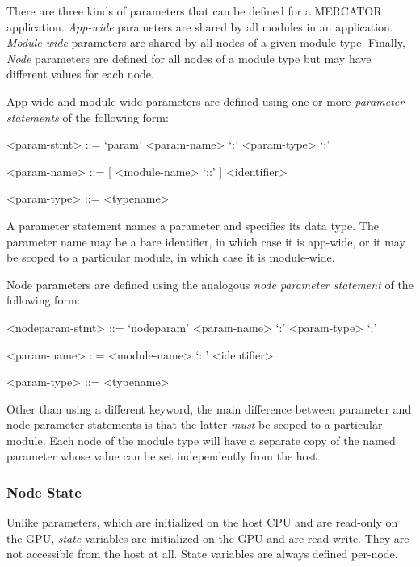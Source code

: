 \documentclass[11pt]{article}
\begin{document}
There are three kinds of parameters that can be defined for a
MERCATOR application.  \emph{App-wide} parameters are shared by
all modules in an application.  \emph{Module-wide} parameters are
shared by all nodes of a given module type.  Finally, \emph{Node}
parameters are defined for all nodes of a module type but may have
different values for each node.

App-wide and module-wide parameters are defined using one or more
\textit{parameter statements} of the following form:
\begin{grammar}

<param-stmt> ::= `param' <param-name> `:' <param-type> `;'

<param-name> ::= [ <module-name> `::' ] <identifier>

<param-type> ::= <typename>

\end{grammar}

A parameter statement names a parameter and specifies its data type.
The parameter name may be a bare identifier, in which case it is
app-wide, or it may be scoped to a particular module, in which case
it is module-wide.

Node parameters are defined using the analogous \textit{node parameter
statement} of the following form:
\begin{grammar}

<nodeparam-stmt> ::= `nodeparam' <param-name> `:' <param-type> `;'

<param-name> ::= <module-name> `::' <identifier>

<param-type> ::= <typename>

\end{grammar}

Other than using a different keyword, the main difference between
parameter and node parameter statements is that the latter \emph{must}
be scoped to a particular module.  Each node of the module type will
have a separate copy of the named parameter whose value can be set
independently from the host.

\subsubsection{Node State}

Unlike parameters, which are initialized on the host CPU and are
read-only on the GPU, \emph{state} variables are initialized on the
GPU and are read-write.  They are not accessible from the host at all.
State variables are always defined per-node.
\end{document}
